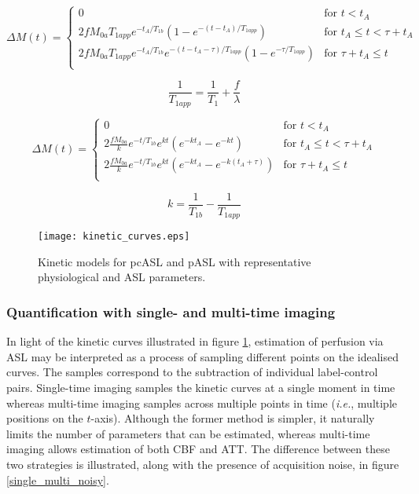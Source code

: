 \begin{equation}
  \Delta M(t) =
  \begin{cases}
    0 & \text{for } t < t_{A} \\
    2 f M_{0a} T_{1app} e^{-t_{A}/T_{1b}} (1 - e^{-(t-t_A)/T_{1app}}) & \text{for } t_{A} \leq t < \tau + t_{A} \\
    2 f M_{0a} T_{1app} e^{-t_{A}/T_{1b}} e^{-(t - t_A - \tau)/T_{1app}} (1 - e^{-\tau/T_{1app}}) & \text{for } \tau + t_{A} \leq t \\
  \end{cases}
  \label{pcasl_kinetic}
\end{equation}

\begin{equation}
\frac{1}{T_{1app}} = \frac{1}{T_1} + \frac{f}{\lambda}
\end{equation}

\begin{equation}
  \Delta M(t) =
  \begin{cases}
    0 & \text{for } t < t_{A} \\
    2 \frac{f M_{0a}}{k} e^{-t/T_{1b}} e^{kt} (e^{-kt_{A}} - e^{-kt}) & \text{for } t_{A} \leq t < \tau + t_{A} \\
    2 \frac{f M_{0a}}{k} e^{-t/T_{1b}} e^{kt} (e^{-kt_{A}} - e^{-k(t_A + \tau)}) & \text{for } \tau + t_{A} \leq t \\
  \end{cases}
  \label{pasl_kinetic}
\end{equation}

\begin{equation}
k = \frac{1}{T_{1b}} - \frac{1}{T_{1app}}
\end{equation}


\begin{figure}[H]
\centering
\texttt{[image: kinetic\_curves.eps]}
\caption{Kinetic models for pcASL and pASL with representative physiological and ASL parameters.}
\label{kinetic_curves}
\end{figure}

\subsubsection{Quantification with single- and multi-time imaging}

In light of the kinetic curves illustrated in figure \ref{kinetic_curves}, estimation of perfusion via ASL may be interpreted as a process of sampling different points on the idealised curves. The samples correspond to the subtraction of individual label-control pairs. Single-time imaging samples the kinetic curves at a single moment in time whereas multi-time imaging samples across multiple points in time (\textit{i.e.}, multiple positions on the $t$-axis). Although the former method is simpler, it naturally limits the number of parameters that can be estimated, whereas multi-time imaging allows estimation of both CBF and ATT. The difference between these two strategies is illustrated, along with the presence of acquisition noise, in figure \ref{single_multi_noisy}. 

